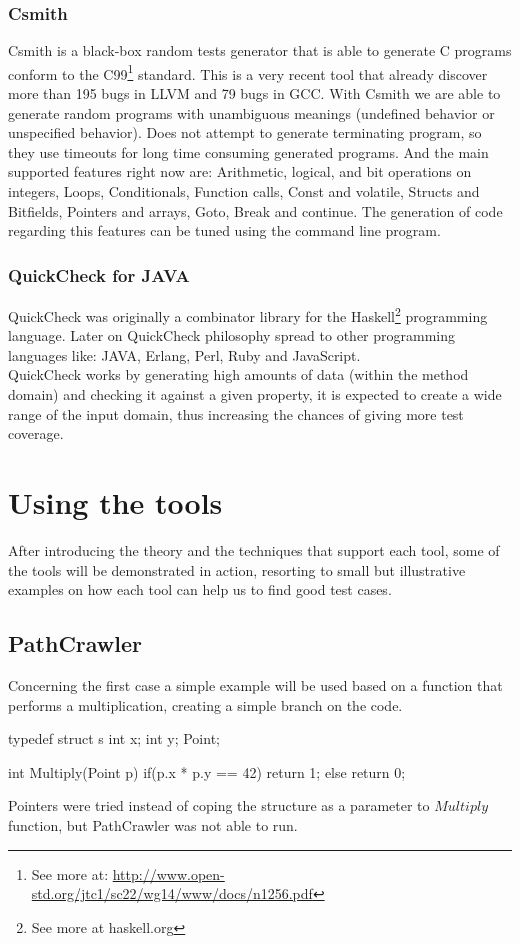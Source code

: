 \subsubsection{Csmith}
Csmith\cite{Yang:2011:FUB:1993316.1993532} is a black-box random tests generator that is able to generate C programs
conform to the C99\footnote{See more at: \url{http://www.open-std.org/jtc1/sc22/wg14/www/docs/n1256.pdf}} standard. This is a very recent tool that already discover
more than 195 bugs in LLVM and 79 bugs in GCC. With Csmith we are able to generate random programs with unambiguous meanings (undefined behavior or 
unspecified behavior). Does not attempt to generate terminating program, so they use timeouts for long time consuming generated programs.
And the main supported features right now are: Arithmetic, logical, and bit operations on integers, Loops, Conditionals, Function calls, Const and volatile,
Structs and Bitfields, Pointers and arrays, Goto, Break and continue. The generation of code regarding this features can be tuned using the command line program.

\subsubsection{QuickCheck for JAVA}
QuickCheck was originally a combinator library for the Haskell\footnote{See more at haskell.org} programming language\cite{Claessen:2000:QLT:357766.351266}.
Later on QuickCheck philosophy spread to other programming languages like: JAVA, Erlang, Perl, Ruby and JavaScript.\\
QuickCheck works by generating high amounts of data (within the method domain) and checking it against a given property,
it is expected to create a wide range of the input domain, thus increasing the chances of giving more test coverage.

\section{Using the tools}\label{testingtools}
After introducing the theory and the techniques that support each tool, some of the tools will be demonstrated in action, resorting to small but illustrative examples
on how each tool can help us to find good test cases.\\

\subsection{PathCrawler}
Concerning the first case  a simple example will be used based on a function that performs a multiplication, creating a simple branch on the code.
\begin{code}
typedef struct s {
    int x;
    int y;
}Point;

int Multiply(Point p) {
    if(p.x * p.y == 42) return 1;
    else return 0;
}
\end{code}
Pointers were tried instead of coping the structure as a parameter to $Multiply$ function, but PathCrawler was not able to run.

